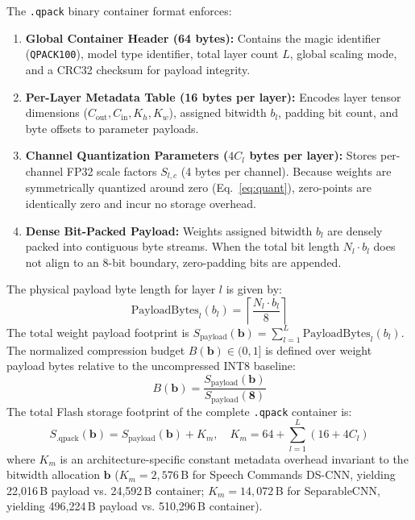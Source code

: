 \documentclass{ieeeaccess}
\begin{document}
The \texttt{.qpack} binary container format enforces:
\begin{enumerate}
    \item \textbf{Global Container Header (64 bytes):} Contains the magic identifier (\texttt{QPACK100}), model type identifier, total layer count $L$, global scaling mode, and a CRC32 checksum for payload integrity.
    \item \textbf{Per-Layer Metadata Table (16 bytes per layer):} Encodes layer tensor dimensions ($C_{\text{out}}, C_{\text{in}}, K_h, K_w$), assigned bitwidth $b_l$, padding bit count, and byte offsets to parameter payloads.
    \item \textbf{Channel Quantization Parameters ($4 C_l$ bytes per layer):} Stores per-channel FP32 scale factors $S_{l, c}$ (4 bytes per channel). Because weights are symmetrically quantized around zero (Eq.~\ref{eq:quant}), zero-points are identically zero and incur no storage overhead.
    \item \textbf{Dense Bit-Packed Payload:} Weights assigned bitwidth $b_l$ are densely packed into contiguous byte streams. When the total bit length $N_l \cdot b_l$ does not align to an 8-bit boundary, zero-padding bits are appended.
\end{enumerate}

The physical payload byte length for layer $l$ is given by:
\begin{equation}
\label{eq:layer_bytes}
\text{PayloadBytes}_l(b_l) = \left\lceil \frac{N_l \cdot b_l}{8} \right\rceil
\end{equation}
The total weight payload footprint is $S_{\text{payload}}(\mathbf{b}) = \sum_{l=1}^{L} \text{PayloadBytes}_l(b_l)$. The normalized compression budget $B(\mathbf{b}) \in (0, 1]$ is defined over weight payload bytes relative to the uncompressed INT8 baseline:
\begin{equation}
\label{eq:budget_ratio}
B(\mathbf{b}) = \frac{S_{\text{payload}}(\mathbf{b})}{S_{\text{payload}}(\mathbf{8})}
\end{equation}
The total Flash storage footprint of the complete \texttt{.qpack} container is:
\begin{equation}
\label{eq:total_storage}
S_{\text{.qpack}}(\mathbf{b}) = S_{\text{payload}}(\mathbf{b}) + K_m, \quad K_m = 64 + \sum_{l=1}^{L} (16 + 4 C_l)
\end{equation}
where $K_m$ is an architecture-specific constant metadata overhead invariant to the bitwidth allocation $\mathbf{b}$ ($K_m = 2{,}576$\,B for Speech Commands DS-CNN, yielding 22,016\,B payload vs. 24,592\,B container; $K_m = 14{,}072$\,B for SeparableCNN, yielding 496,224\,B payload vs. 510,296\,B container).
\end{document}
